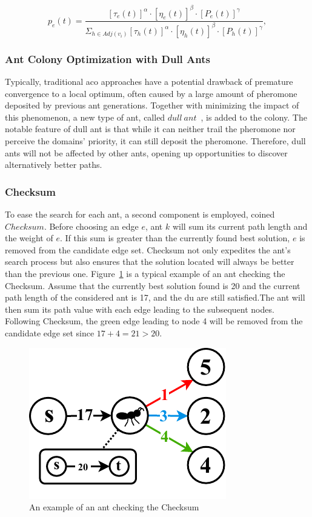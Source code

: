 \begin{equation}
	\label{equation:edge_pick}
	p_e(t) = 
	\frac{[\tau_e(t)]^{\alpha} \cdot [\eta_e(t)]^{\beta} \cdot  [P_e(t)]^{\gamma}}{\Sigma_{h \in Adj(v_i)} [\tau_h(t)]^{\alpha} \cdot [\eta_h(t)]^{\beta} \cdot [P_h(t)]^{\gamma}},
\end{equation}

\subsubsection{Ant Colony Optimization with Dull Ants}
Typically, traditional \gls{aco} approaches have a potential drawback of premature convergence to a local optimum, often caused by a large amount of pheromone deposited by previous ant generations. Together with minimizing the impact of this phenomenon, a new type of ant, called $dull~ant$~\cite{shimomura2010ant}, is added to the colony. The notable feature of dull ant is that while it can neither trail the pheromone nor perceive the domains' priority, it can still deposit the pheromone. Therefore, dull ants will not be affected by other ants, opening up opportunities to discover alternatively better paths.

\subsubsection{Checksum}
To ease the search for each ant, a second component is employed, coined $Checksum$. Before choosing an edge $e$, ant $k$ will sum its current path length and the weight of $e$. If this sum is greater than the currently found best solution, $e$ is removed from the candidate edge set. Checksum not only expedites the ant's search process but also ensures that the solution located will always be better than the previous one.
Figure~\ref{fig:checksum} is a typical example of an ant checking the Checksum. Assume that the currently best solution found is 20 and the current path length of the considered ant is 17, and the \gls{du} are still satisfied.The ant will then sum its path value with each edge leading to the subsequent nodes. Following Checksum, the green edge leading to node 4 will be removed from the candidate edge set since $17 + 4 = 21 > 20$.

\setlength{\intextsep}{3pt}
\renewcommand{\scalefigure}{1.1}
\begin{figure}[htbp]
	\centering
	\includegraphics[scale=\scalefigure]{Figures/chap 3/CheckSum.pdf}
	\caption{An example of an ant checking the Checksum}
	\label{fig:checksum}
\end{figure}

